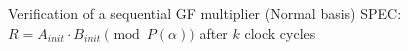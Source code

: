 \documentclass[xcolor=dvipsnames]{beamer}
\newcommand{\bi}{\begin{itemize}}
\newcommand{\ei}{\end{itemize}}
\begin{document}
\begin{frame}{\large{Verification of a sequential GF multiplier (Normal basis)}}
SPEC: $R = A_{init}\cdot B_{init} \pmod {P(\alpha)}$ after $k$ clock cycles
\hspace{-0.3in}\begin{figure}[hbt]
\end{figure}
\end{frame}
% 
% 
\end{document}
